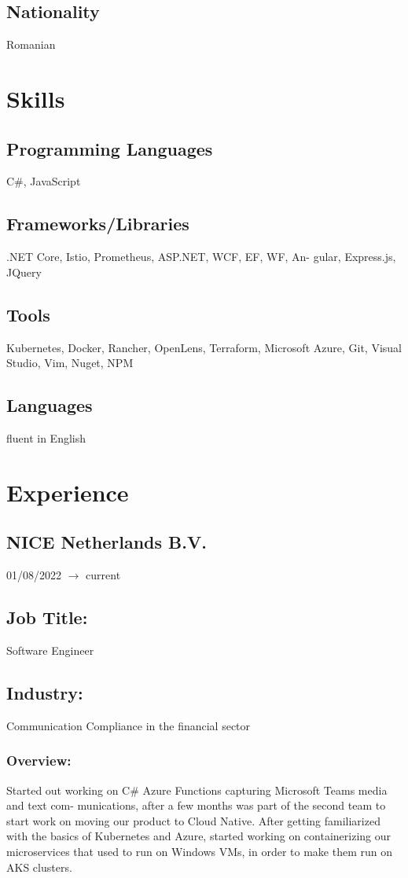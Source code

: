 \documentclass[a4paper,hidelinks,11pt]{article}
\begin{document}
\subsection{Nationality} Romanian

\section{Skills}
\subsection{Programming Languages}
C\#, JavaScript
\subsection{Frameworks/Libraries}
.NET Core, Istio, Prometheus, ASP.NET, WCF, EF, WF, An-
gular, Express.js, JQuery 
\subsection{Tools}
Kubernetes, Docker, Rancher, OpenLens, Terraform, Microsoft Azure,
Git, Visual Studio, Vim, Nuget, NPM
\subsection{Languages}
fluent in English

\section{Experience}
\subsection{NICE Netherlands B.V.} 01/08/2022 $\rightarrow$ current
\subsection{Job Title:} Software Engineer
\subsection{Industry:} Communication Compliance in the financial sector
\subsubsection{Overview:}
Started out working on C\# Azure Functions capturing Microsoft Teams media and text com-
munications, after a few months was part of the second team to start work on moving our
product to Cloud Native. After getting familiarized with the basics of Kubernetes and Azure,
started working on containerizing our microservices that used to run on Windows VMs, in order
to make them run on AKS clusters.
\end{document}
